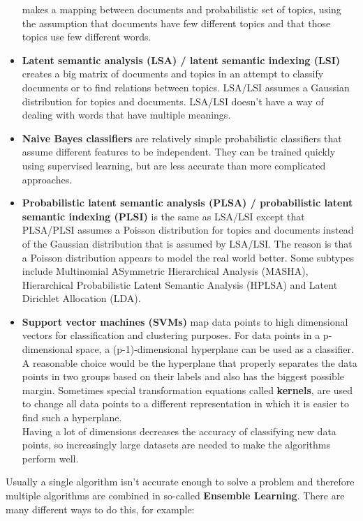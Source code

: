 \begin{itemize}
		makes a mapping between documents and probabilistic set of topics, using the assumption that documents have few different topics and that those topics use few different words.
	\item \textbf{Latent semantic analysis (LSA) / latent semantic indexing (LSI)}
		creates a big matrix of documents and topics in an attempt to classify documents or to find relations between topics. LSA/LSI assumes a Gaussian distribution for topics and documents. LSA/LSI doesn't have a way of dealing with words that have multiple meanings.
	\item \textbf{Naive Bayes classifiers}
		are relatively simple probabilistic classifiers that assume different features to be independent. They can be trained quickly using supervised learning, but are less accurate than more complicated approaches.
	\item \textbf{Probabilistic latent semantic analysis (PLSA) / probabilistic latent semantic indexing (PLSI)}
		is the same as LSA/LSI except that PLSA/PLSI assumes a Poisson distribution for topics and documents instead of the Gaussian distribution that is assumed by LSA/LSI. The reason is that a Poisson distribution appears to model the real world better. Some subtypes include Multinomial ASymmetric Hierarchical Analysis (MASHA), Hierarchical Probabilistic Latent Semantic Analysis (HPLSA) and Latent Dirichlet Allocation (LDA).
	\item \textbf{Support vector machines (SVMs)}
		map data points to high dimensional vectors for classification and clustering purposes. For data points in a p-dimensional space, a (p-1)-dimensional hyperplane can be used as a classifier. A reasonable choice would be the hyperplane that properly separates the data points in two groups based on their labels and also has the biggest possible margin. Sometimes special transformation equations called \textbf{kernels}, are used to change all data points to a different representation in which it is easier to find such a hyperplane.\\
		Having a lot of dimensions decreases the accuracy of classifying new data points, so increasingly large datasets are needed to make the algorithms perform well.
\end{itemize}

Usually a single algorithm isn't accurate enough to solve a problem and therefore multiple algorithms are combined in so-called \textbf{Ensemble Learning}. There are many different ways to do this, for example:

